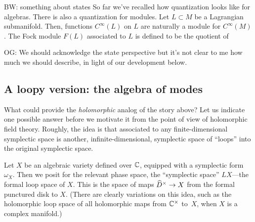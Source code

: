 \documentclass[11pt]{amsart}
\def\brian#1{{\textcolor{blue!75!red}{BW: {#1}}}}
\def\owen#1{{\textcolor{violet!50!black}{OG: {#1}}}}
\begin{document}
\brian{something about states}
So far we've recalled how quantization looks like for algebras.
There is also a quantization for modules.
Let $L \subset M$ be a Lagrangian submanifold.
Then, functions $C^\infty(L)$ on $L$ are naturally a module for $C^\infty(M)$.
The Fock module $F(L)$ associated to $L$ is defined to be the quotient of 

\owen{We should acknowledge the state perspective but it's not clear to me how much we should describe, in light of our development below.}

\subsection{A loopy version: the algebra of modes}

What could provide the {\em holomorphic} analog of the story above?
Let us indicate one possible answer before we motivate it from the point of view of holomorphic field theory.
Roughly, the idea is that associated to any finite-dimensional symplectic space is another, infinite-dimensional, symplectic space of ``loops'' into the original symplectic space.


Let $X$ be an algebraic variety defined over $\CC$, equipped with a symplectic form $\omega_X$.
Then we posit for the relevant phase space, the ``symplectic space'' $LX$---the formal loop space of $X$.
This is the space of maps $\Hat{D}^\times \to X$ from the formal punctured disk to $X$.
%
(There are clearly variations on this idea, such as the holomorphic loop space of all holomorphic maps from $\CC^\times$ to~$X$, when $X$ is a complex manifold.)
\end{document}
